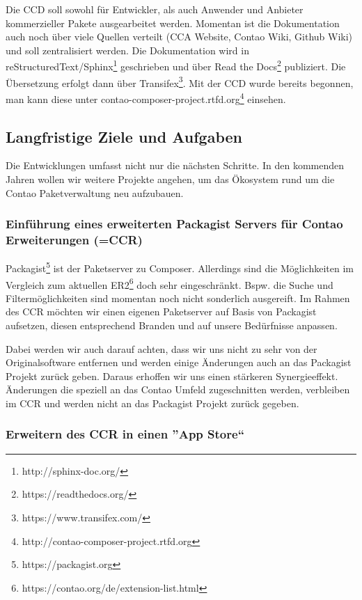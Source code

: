 \documentclass[
paper=a4,
draft=false,%
fontsize=10pt%
]{scrartcl}
\begin{document}
Die CCD soll sowohl für Entwickler, als auch Anwender und Anbieter kommerzieller Pakete ausgearbeitet werden. Momentan ist die Dokumentation auch noch über viele Quellen verteilt (CCA Website, Contao Wiki, Github Wiki) und soll zentralisiert werden. Die Dokumentation wird in reStructuredText/Sphinx\footnote{http://sphinx-doc.org/} geschrieben und über Read the Docs\footnote{https://readthedocs.org/} publiziert. Die Übersetzung erfolgt dann über Transifex\footnote{https://www.transifex.com/}.
Mit der CCD wurde bereits begonnen, man kann diese unter contao-composer-project.rtfd.org\footnote{http://contao-composer-project.rtfd.org} einsehen.

\subsection{Langfristige Ziele und Aufgaben}

Die Entwicklungen umfasst nicht nur die nächsten Schritte. In den kommenden Jahren wollen wir weitere Projekte angehen, um das Ökosystem rund um die Contao Paketverwaltung neu aufzubauen.

\subsubsection{Einführung eines erweiterten Packagist Servers für Contao Erweiterungen (=CCR)}

Packagist\footnote{https://packagist.org} ist der Paketserver zu Composer. Allerdings sind die Möglichkeiten im Vergleich zum aktuellen ER2\footnote{https://contao.org/de/extension-list.html} doch sehr eingeschränkt. Bspw. die Suche und Filtermöglichkeiten sind momentan noch nicht sonderlich ausgereift. Im Rahmen des CCR möchten wir einen eigenen Paketserver auf Basis von Packagist aufsetzen, diesen entsprechend Branden und auf unsere Bedürfnisse anpassen.

Dabei werden wir auch darauf achten, dass wir uns nicht zu sehr von der Originalsoftware entfernen und werden einige Änderungen auch an das Packagist Projekt zurück geben. Daraus erhoffen wir uns einen stärkeren Synergieeffekt. Änderungen die speziell an das Contao Umfeld zugeschnitten werden, verbleiben im CCR und werden nicht an das Packagist Projekt zurück gegeben.

\subsubsection{Erweitern des CCR in einen ''App Store``}
\end{document}
